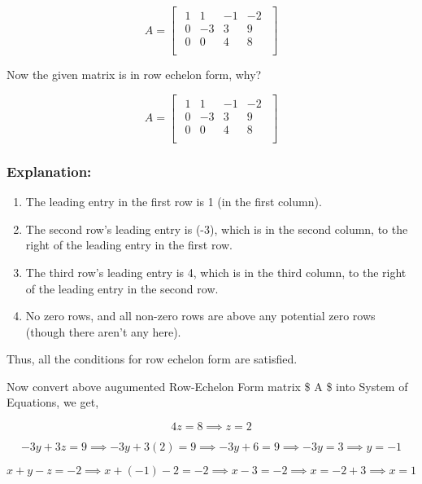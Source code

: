 \documentclass[11pt]{article}
\providecommand{\tightlist}{%
      \setlength{\itemsep}{0pt}\setlength{\parskip}{0pt}}
\begin{document}
    \[
A = \begin{bmatrix}
\begin{array}{ccc|c}
1 & 1 & -1 & -2 \\
0 & -3 & 3 & 9 \\
0 & 0 & 4 & 8 \\
\end{array}
\end{bmatrix}
\]

    Now the given matrix is in row echelon form, why?

\[
A = \begin{bmatrix}
\begin{array}{ccc|c}
1 & 1 & -1 & -2 \\
0 & -3 & 3 & 9 \\
0 & 0 & 4 & 8 \\
\end{array}
\end{bmatrix}
\]

\hypertarget{explanation}{%
\subsubsection{Explanation:}\label{explanation}}

\begin{enumerate}
\def\labelenumi{\arabic{enumi}.}
\tightlist
\item
  The leading entry in the first row is 1 (in the first column).
\item
  The second row's leading entry is (-3), which is in the second column,
  to the right of the leading entry in the first row.
\item
  The third row's leading entry is 4, which is in the third column, to
  the right of the leading entry in the second row.
\item
  No zero rows, and all non-zero rows are above any potential zero rows
  (though there aren't any here).
\end{enumerate}

Thus, all the conditions for row echelon form are satisfied.

    

    Now convert above augumented Row-Echelon Form matrix \$ A \$ into System
of Equations, we get,

    \[
4z = 8 \implies z = 2
\]

\[
-3y + 3z = 9 \implies -3y + 3(2) = 9 \implies -3y + 6 = 9 \implies -3y = 3 \implies y = -1
\]

\[
x + y - z = -2 \implies x + (-1) - 2 = -2 \implies x - 3 = -2 \implies x = -2 + 3 \implies x = 1
\]
\end{document}
